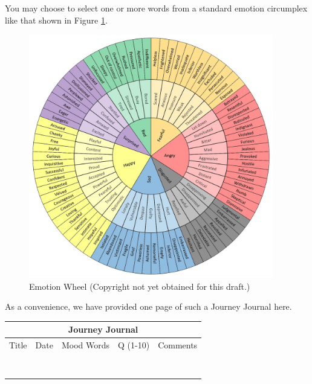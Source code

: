 \documentclass[12pt]{book}
\begin{document}
You may choose to select one or more words from a standard
emotion circumplex like that shown in Figure \ref{fig:emotionwheel}.
\begin{figure}
  \centering
     \includegraphics[width=0.95\textwidth]{WacuriFigures/EmotionWheel.jpg}
     \caption{Emotion Wheel (Copyright not yet obtained for this draft.)}
  \label{fig:emotionwheel}     
\end{figure}


As a convenience, we have provided one page of such a Journey Journal here.

\begin{tabular}{ |p{2cm}||p{2cm}|p{3cm}|p{1cm}|p{5cm}|  }
 \hline
 \multicolumn{5}{|c|}{Journey Journal} \\
 \hline
 Title& Date & Mood Words & Q (1-10) & Comments\\
  \hline
 \hline
 & & & & \\
 \hline 
 & & & & \\
 \hline 
 & & & & \\
 \hline 
 & & & & \\
 \hline 
 & & & & \\
 \hline 
 & & & & \\
 \hline 
 & & & & \\
 \hline 
  & & & & \\
 \hline
  \hline
\end{tabular}
\end{document}
